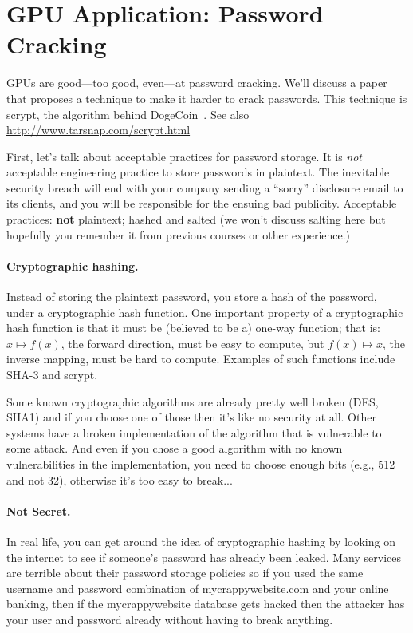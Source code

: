 




\section*{GPU Application: Password Cracking}

GPUs are good---too good, even---at password cracking. We'll discuss a paper
that proposes a technique to make it harder to crack passwords. This technique
is scrypt, the algorithm behind DogeCoin~\cite{scrypt}. See also \url{http://www.tarsnap.com/scrypt.html}

First, let's talk about acceptable practices for password storage. It is \emph{not}
acceptable engineering practice to store passwords in plaintext. The inevitable security
breach will end with your company sending a ``sorry'' disclosure email to its clients,
and you will be responsible for the ensuing bad publicity. Acceptable practices: {\bf not} plaintext; hashed and salted (we won't discuss salting here but hopefully you remember it from previous courses or other experience.)

\paragraph{Cryptographic hashing.} Instead of storing the plaintext password, you
store a hash of the password, under a cryptographic hash function. One important
property of a cryptographic hash function is that it must be (believed to be a) one-way
function; that is: $x \mapsto f(x)$, the forward direction, must be easy to compute, but
$f(x) \mapsto x$, the inverse mapping, must be hard to compute. Examples of such functions
include SHA-3 and scrypt. 

Some known cryptographic algorithms are already pretty well broken (DES, SHA1) and if you choose one of those then it's like no security at all. Other systems have a broken implementation of the algorithm that is vulnerable to some attack. And even if you chose a good algorithm with no known vulnerabilities in the implementation, you need to choose enough bits (e.g., 512 and not 32), otherwise it's too easy to break...

\paragraph{Not Secret.}
In real life, you can get around the idea of cryptographic hashing by looking on the internet to see if someone's password has already been leaked. Many services are terrible about their password storage policies so if you used the same username and password combination of mycrappywebsite.com and your online banking, then if the mycrappywebsite database gets hacked then the attacker has your user and password already without having to break anything.

